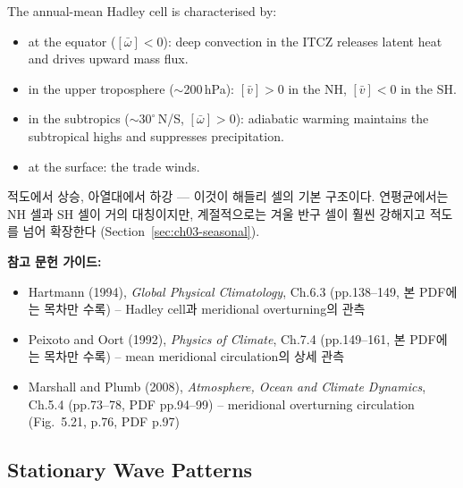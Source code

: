 \begin{definition}
The annual-mean Hadley cell is characterised by:
\begin{itemize}
  \item {} at the equator ($[\bar{\omega}] < 0$): deep convection in the ITCZ
        releases latent heat and drives upward mass flux.
  \item {} in the upper troposphere ($\sim$200\,hPa): $[\bar{v}] > 0$ in the NH,
        $[\bar{v}] < 0$ in the SH.
  \item {} in the subtropics ($\sim$$30^{\circ}$\,N/S, $[\bar{\omega}] > 0$):
        adiabatic warming maintains the subtropical highs and suppresses precipitation.
  \item {} at the surface: the trade winds.
\end{itemize}
\end{definition}

\begin{hisublock}
적도에서 상승, 아열대에서 하강 --- 이것이 해들리 셀의 기본 구조이다.
연평균에서는 NH 셀과 SH 셀이 거의 대칭이지만, 계절적으로는 겨울 반구 셀이
훨씬 강해지고 적도를 넘어 확장한다 (Section~\ref{sec:ch03-seasonal}).
\end{hisublock}

\begin{hisublock}
\textbf{참고 문헌 가이드:}
\begin{itemize}
  \item Hartmann (1994), \textit{Global Physical Climatology}, Ch.6.3 (pp.138--149, 본 PDF에는 목차만 수록) -- Hadley cell과 meridional overturning의 관측
  \item Peixoto and Oort (1992), \textit{Physics of Climate}, Ch.7.4 (pp.149--161, 본 PDF에는 목차만 수록) -- mean meridional circulation의 상세 관측
  \item Marshall and Plumb (2008), \textit{Atmosphere, Ocean and Climate Dynamics}, Ch.5.4 (pp.73--78, PDF pp.94--99) -- meridional overturning circulation (Fig.~5.21, p.76, PDF p.97)
\end{itemize}
\end{hisublock}


\subsection{Stationary Wave Patterns}


